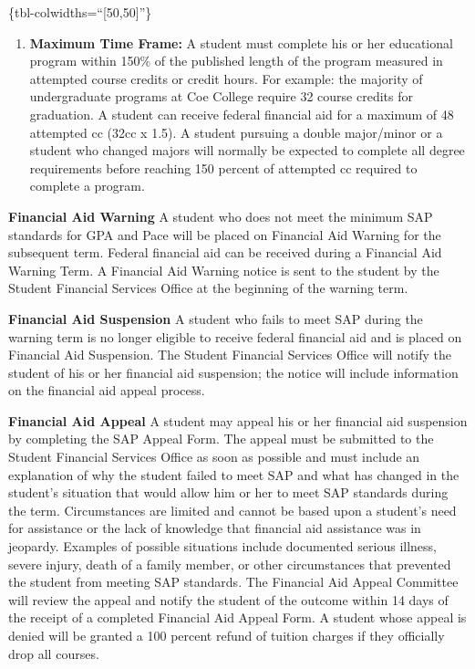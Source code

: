 \documentclass[
  letterpaper,
]{scrbook}
\providecommand{\tightlist}{%
  \setlength{\itemsep}{0pt}\setlength{\parskip}{0pt}}
\begin{document}
\{tbl-colwidths=``{[}50,50{]}''\}

\begin{enumerate}
\def\labelenumi{\arabic{enumi}.}
\setcounter{enumi}{2}
\tightlist
\item
  \textbf{Maximum Time Frame:} A student must complete his or her
  educational program within 150\% of the published length of the
  program measured in attempted course credits or credit hours. For
  example: the majority of undergraduate programs at Coe College require
  32 course credits for graduation. A student can receive federal
  financial aid for a maximum of 48 attempted cc (32cc x 1.5). A student
  pursuing a double major/minor or a student who changed majors will
  normally be expected to complete all degree requirements before
  reaching 150 percent of attempted cc required to complete a program.
\end{enumerate}

\textbf{Financial Aid Warning} A student who does not meet the minimum
SAP standards for GPA and Pace will be placed on Financial Aid Warning
for the subsequent term. Federal financial aid can be received during a
Financial Aid Warning Term. A Financial Aid Warning notice is sent to
the student by the Student Financial Services Office at the beginning of
the warning term.

\textbf{Financial Aid Suspension} A student who fails to meet SAP during
the warning term is no longer eligible to receive federal financial aid
and is placed on Financial Aid Suspension. The Student Financial
Services Office will notify the student of his or her financial aid
suspension; the notice will include information on the financial aid
appeal process.

\textbf{Financial Aid Appeal} A student may appeal his or her financial
aid suspension by completing the SAP Appeal Form. The appeal must be
submitted to the Student Financial Services Office as soon as possible
and must include an explanation of why the student failed to meet SAP
and what has changed in the student's situation that would allow him or
her to meet SAP standards during the term. Circumstances are limited and
cannot be based upon a student's need for assistance or the lack of
knowledge that financial aid assistance was in jeopardy. Examples of
possible situations include documented serious illness, severe injury,
death of a family member, or other circumstances that prevented the
student from meeting SAP standards. The Financial Aid Appeal Committee
will review the appeal and notify the student of the outcome within 14
days of the receipt of a completed Financial Aid Appeal Form. A student
whose appeal is denied will be granted a 100 percent refund of tuition
charges if they officially drop all courses.
\end{document}

